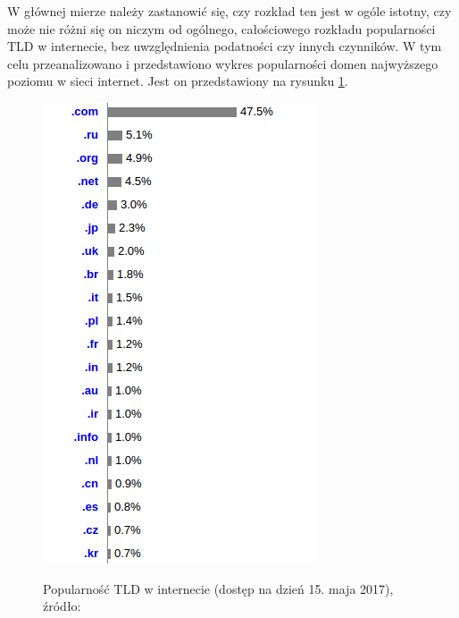 W głównej mierze należy zastanowić się, czy rozkład ten jest w ogóle istotny, czy może nie różni się on niczym od ogólnego, całościowego rozkładu popularności TLD w internecie, bez uwzględnienia podatności czy innych czynników. W tym celu przeanalizowano i przedstawiono wykres popularności domen najwyższego poziomu w sieci internet\cite{TLD_popularity}. Jest on przedstawiony na rysunku \ref{TLD_all}.
\begin{center}
	\begin{figure}
		\includegraphics[scale=0.75]{image/TLD_all}\label{TLD_all}
		\caption{Popularność TLD w internecie (dostęp na dzień 15. maja 2017), źródło:  \cite{TLD_popularity}}
	\end{figure}
\end{center}  

